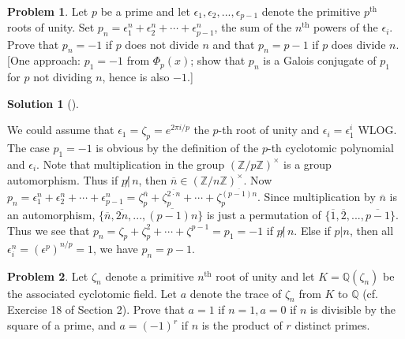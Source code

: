 \documentclass{article}
\theoremstyle{definition}
\newtheorem{prob}{Problem}
\newtheorem*{sol}{Solution}
\newenvironment{sols}[1][]{%
  \begin{sol}[#1]$ $\par\nobreak\ignorespaces
}{%
  \end{sol}
}
\newcommand{\QQ}{\mathbb Q}
\newcommand{\ZZ}{\mathbb Z}
\begin{document}
\setcounter{prob}{4}
\begin{prob}
	Let $p$ be a prime and let $\epsilon_1, \epsilon_2, ..., \epsilon_{p - 1}$ denote the primitive $p^{\text{th}}$ roots of unity.
	Set $p_n = \epsilon_1^n + \epsilon_2^n + \cdots + \epsilon_{p - 1}^n$, the sum of the $n^{\text{th}}$ powers of the $\epsilon_i$.
	Prove that $p_n = -1$ if $p$ does not divide $n$ and that $p_n = p - 1$ if $p$ does divide $n$.
	[One approach: $p_1 = -1$ from $\Phi_p(x)$; show that $p_n$ is a Galois conjugate of $p_1$ for $p$ not dividing $n$, hence is also $-1$.]
\end{prob}

\begin{sols}
	We could assume that $\epsilon_1 = \zeta_p = e^{2 \pi i/p}$ the $p$-th root of unity and $\epsilon_i = \epsilon_1^i$ WLOG.
	The case $p_1 = -1$ is obvious by the definition of the $p$-th cyclotomic polynomial and $\epsilon_i$.
	Note that multiplication in the group $(\ZZ/p \ZZ)^\times$ is a group automorphism.
	Thus if $p \not| \, n$, then $\overline{n} \in (\ZZ/n \ZZ)^\times$.
	Now $p_n = \epsilon_1^n + \epsilon_2^n + \cdots + \epsilon_{p - 1}^n = \zeta_p^{\overline{n}}+ \zeta_p^{ \overline{2 \cdot n}} + \cdots + \zeta_p^{\overline{(p - 1) n}}$.
	Since multiplication by $\overline{n}$ is an automorphism, $\{\overline{n}, \overline{2n}, ..., \overline{(p - 1)n}\}$ is just a permutation of $\{\overline{1}, \overline{2}, ..., \overline{p - 1}\}$.
	Thus we see that $p_n = \zeta_p + \zeta_p^2 + \cdots + \zeta^{p - 1} = p_1 = -1$ if $p \not| \, n$.
	Else if $p | n$, then all $\epsilon_i^n = (\epsilon^p)^{n/p} = 1$, we have $p_n = p - 1$.
\end{sols}

\begin{prob}
	Let $\zeta_n$ denote a primitive $n^{\text{th}}$ root of unity and let $K = \QQ(\zeta_n)$ be the associated cyclotomic field.
	Let $a$ denote the trace of $\zeta_n$ from $K$ to $\QQ$ (cf. Exercise 18 of Section 2).
	Prove that $a = 1$ if $n = 1, a = 0$ if $n$ is divisible by the square of a prime, and $a = (-1)^r$ if $n$ is the product of $r$ distinct primes.
\end{prob}
\end{document}
